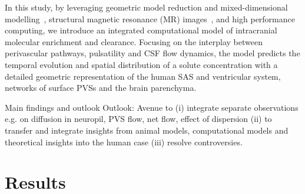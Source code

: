 \documentclass[fleqn,10pt]{wlscirep}
\newcommand{\mer}[1]{\textcolor{magenta}{#1}}
\newcommand{\draft}[1]{\textcolor{lightgray}{#1}}
\begin{document}
In this study, by leveraging geometric model reduction and
mixed-dimensional modelling~\cite{masri2024modelling}, structural
magnetic resonance (MR) images~\cite{hodneland2019new}, and high
performance computing, we introduce an integrated computational model
of intracranial molecular enrichment and clearance. Focusing on the
interplay between perivascular pathways, pulsatility and CSF flow
dynamics, the model predicts the temporal evolution and spatial
distribution of a solute concentration with a detailed geometric
representation of the human SAS and ventricular system, networks of
surface PVSs and the brain
parenchyma. \draft{\lipsum[2]}


Main findings and outlook \draft{\lipsum[1]} Outlook:
  Avenue to (i) integrate separate observations e.g. on diffusion in
  neuropil, PVS flow, net flow, effect of dispersion (ii) to transfer
  and integrate insights from animal models, computational models and
  theoretical insights into the human case (iii) resolve
  controversies.


  


\section*{Results}
\end{document}
